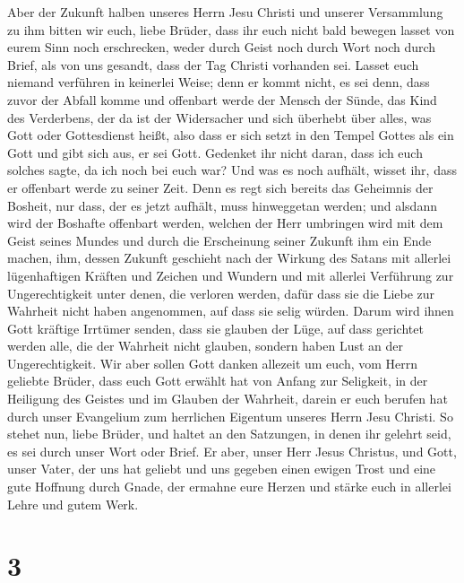  Aber der Zukunft halben unseres Herrn Jesu Christi und
unserer Versammlung zu ihm bitten wir euch, liebe Brüder, 
dass ihr euch nicht bald bewegen lasset von eurem Sinn noch erschrecken,
weder durch Geist noch durch Wort noch durch Brief, als von uns gesandt,
dass der Tag Christi vorhanden sei.  Lasset euch niemand
verführen in keinerlei Weise; denn er kommt nicht, es sei denn, dass
zuvor der Abfall komme und offenbart werde der Mensch der Sünde, das
Kind des Verderbens,  der da ist der Widersacher und sich
überhebt über alles, was Gott oder Gottesdienst heißt, also dass er sich
setzt in den Tempel Gottes als ein Gott und gibt sich aus, er sei Gott.
 Gedenket ihr nicht daran, dass ich euch solches sagte, da
ich noch bei euch war?  Und was es noch aufhält, wisset
ihr, dass er offenbart werde zu seiner Zeit.  Denn es regt
sich bereits das Geheimnis der Bosheit, nur dass, der es jetzt aufhält,
muss hinweggetan werden;  und alsdann wird der Boshafte
offenbart werden, welchen der Herr umbringen wird mit dem Geist seines
Mundes und durch die Erscheinung seiner Zukunft ihm ein Ende machen,
 ihm, dessen Zukunft geschieht nach der Wirkung des Satans
mit allerlei lügenhaftigen Kräften und Zeichen und Wundern
 und mit allerlei Verführung zur Ungerechtigkeit unter
denen, die verloren werden, dafür dass sie die Liebe zur Wahrheit nicht
haben angenommen, auf dass sie selig würden.  Darum wird
ihnen Gott kräftige Irrtümer senden, dass sie glauben der Lüge,
 auf dass gerichtet werden alle, die der Wahrheit nicht
glauben, sondern haben Lust an der Ungerechtigkeit.  Wir
aber sollen Gott danken allezeit um euch, vom Herrn geliebte Brüder,
dass euch Gott erwählt hat von Anfang zur Seligkeit, in der Heiligung
des Geistes und im Glauben der Wahrheit,  darein er euch
berufen hat durch unser Evangelium zum herrlichen Eigentum unseres Herrn
Jesu Christi.  So stehet nun, liebe Brüder, und haltet an
den Satzungen, in denen ihr gelehrt seid, es sei durch unser Wort oder
Brief.  Er aber, unser Herr Jesus Christus, und Gott,
unser Vater, der uns hat geliebt und uns gegeben einen ewigen Trost und
eine gute Hoffnung durch Gnade,  der ermahne eure Herzen
und stärke euch in allerlei Lehre und gutem Werk.

\hypertarget{section-2}{%
\section{3}\label{section-2}}

